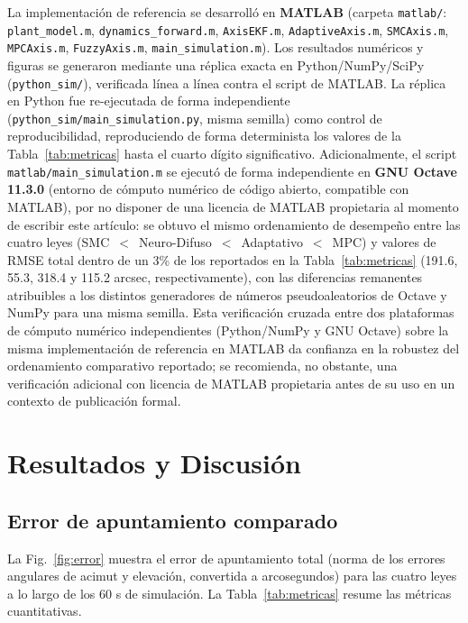 \documentclass[journal]{IEEEtran}
\begin{document}
La implementación de referencia se desarrolló en \textbf{MATLAB} (carpeta
\texttt{matlab/}: \texttt{plant\_model.m}, \texttt{dynamics\_forward.m},
\texttt{AxisEKF.m}, \texttt{AdaptiveAxis.m}, \texttt{SMCAxis.m},
\texttt{MPCAxis.m}, \texttt{FuzzyAxis.m}, \texttt{main\_simulation.m}). Los
resultados numéricos y figuras se generaron mediante una réplica exacta en
Python/NumPy/SciPy (\texttt{python\_sim/}), verificada línea a línea
contra el script de MATLAB. La réplica en Python fue re-ejecutada de forma
independiente (\texttt{python\_sim/main\_simulation.py}, misma semilla)
como control de reproducibilidad, reproduciendo de forma determinista los
valores de la Tabla~\ref{tab:metricas} hasta el cuarto dígito
significativo. Adicionalmente, el script \texttt{matlab/main\_simulation.m}
se ejecutó de forma independiente en \textbf{GNU Octave 11.3.0} (entorno
de cómputo numérico de código abierto, compatible con MATLAB), por no
disponer de una licencia de MATLAB propietaria al momento de escribir este
artículo: se obtuvo el mismo ordenamiento de desempeño entre las cuatro
leyes (SMC~$<$~Neuro-Difuso~$<$~Adaptativo~$<$~MPC) y valores de RMSE
total dentro de un 3\% de los reportados en la Tabla~\ref{tab:metricas}
(191.6, 55.3, 318.4 y 115.2 arcsec, respectivamente), con las diferencias
remanentes atribuibles a los distintos generadores de números
pseudoaleatorios de Octave y NumPy para una misma semilla. Esta
verificación cruzada entre dos plataformas de cómputo numérico
independientes (Python/NumPy y GNU Octave) sobre la misma implementación
de referencia en MATLAB da confianza en la robustez del ordenamiento
comparativo reportado; se recomienda, no obstante, una verificación
adicional con licencia de MATLAB propietaria antes de su uso en un
contexto de publicación formal.

\section{Resultados y Discusión}
\label{sec:resultados}

\subsection{Error de apuntamiento comparado}
La Fig.~\ref{fig:error} muestra el error de apuntamiento total (norma de
los errores angulares de acimut y elevación, convertida a arcosegundos)
para las cuatro leyes a lo largo de los 60 s de simulación. La
Tabla~\ref{tab:metricas} resume las métricas cuantitativas.
\end{document}
